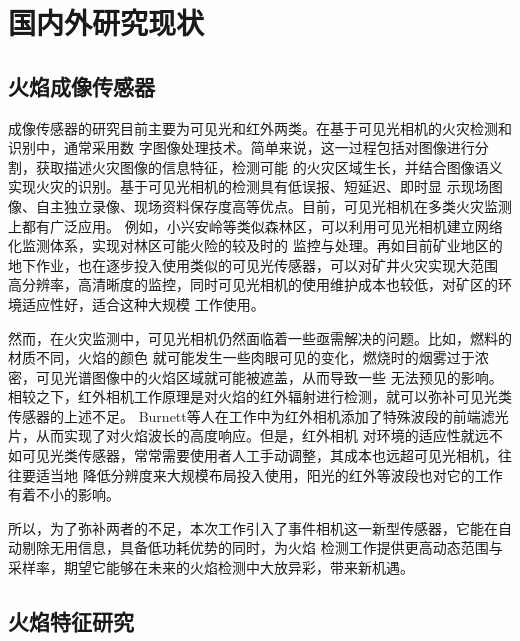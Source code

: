 \section{国内外研究现状}

\subsection{火焰成像传感器}

成像传感器的研究目前主要为可见光和红外两类。在基于可见光相机的火灾检测和识别中，通常采用数
字图像处理技术。简单来说，这一过程包括对图像进行分割，获取描述火灾图像的信息特征，检测可能
的火灾区域生长，并结合图像语义实现火灾的识别。基于可见光相机的检测具有低误报、短延迟、即时显
示现场图像、自主独立录像、现场资料保存度高等优点。目前，可见光相机在多类火灾监测上都有广泛应用。
例如，小兴安岭等类似森林区，可以利用可见光相机建立网络化监测体系，实现对林区可能火险的较及时的
监控与处理\cite{liujinxin}。再如目前矿业地区的地下作业，也在逐步投入使用类似的可见光传感器，可以对矿井火灾实现大范围
高分辨率，高清晰度的监控，同时可见光相机的使用维护成本也较低，对矿区的环境适应性好，适合这种大规模
工作使用\cite{wyb}。

然而，在火灾监测中，可见光相机仍然面临着一些亟需解决的问题。比如，燃料的材质不同，火焰的颜色
就可能发生一些肉眼可见的变化，燃烧时的烟雾过于浓密，可见光谱图像中的火焰区域就可能被遮盖，从而导致一些
无法预见的影响。相较之下，红外相机工作原理是对火焰的红外辐射进行检测，就可以弥补可见光类传感器的上述不足。
Burnett等人\cite{burnett2018low}在工作中为红外相机添加了特殊波段的前端滤光片，从而实现了对火焰波长的高度响应。但是，红外相机
对环境的适应性就远不如可见光类传感器，常常需要使用者人工手动调整，其成本也远超可见光相机，往往要适当地
降低分辨度来大规模布局投入使用，阳光的红外等波段也对它的工作有着不小的影响。

所以，为了弥补两者的不足，本次工作引入了事件相机这一新型传感器，它能在自动剔除无用信息，具备低功耗优势的同时，为火焰
检测工作提供更高动态范围与采样率，期望它能够在未来的火焰检测中大放异彩，带来新机遇。

\subsection{火焰特征研究}

